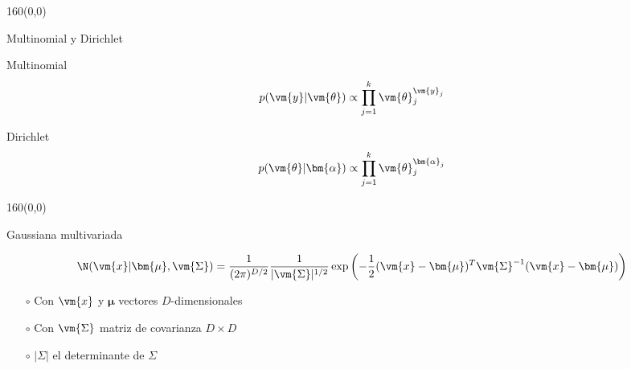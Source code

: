 \documentclass[shownotes,aspectratio=169]{beamer}
\begin{document}
\begin{frame}[plain]
 \begin{textblock}{160}(0,0)
\begin{center}
 \Large Multinomial y Dirichlet \\
\end{center}
\end{textblock}
 \vspace{0.75cm}

 
 \pause
 Multinomial
 \begin{align*}
  p(\vm{y}|\vm{\theta}) \propto \prod_{j=1}^k \vm{\theta}_j^{\vm{y}_j}
 \end{align*}

 
 \pause
 Dirichlet
 \begin{align*}
  p(\vm{\theta}|\bm{\alpha}) \propto \prod_{j=1}^k \vm{\theta}_j^{\bm{\alpha}_j}
 \end{align*}

 
 
 
 \end{frame}

 

%  
%  
%  
 

 \begin{frame}[plain]
 \begin{textblock}{160}(0,0)
\begin{center}
 \Large Gaussiana multivariada
\end{center}
\end{textblock}


\begin{align*}
\N(\vm{x}|\bm{\mu},\vm{\Sigma}) = \frac{1}{(2\pi)^{D/2}} \frac{1}{|\vm{\Sigma}|^{1/2}} \exp\left( - \frac{1}{2} (\vm{x}-\bm{\mu})^T \vm{\Sigma}^{-1} (\vm{x}-\bm{\mu}) \right)
\end{align*}

\vspace{0.5cm}

\begin{itemize}
 \item[$\circ$] Con $\vm{x}$ y $\bm{\mu}$ vectores $D$-dimensionales
 \item[$\circ$] Con $\vm{\Sigma}$ matriz de covarianza $D \times D$
 \item[$\circ$] $|\Sigma|$ el determinante de $\Sigma$
\end{itemize}

 \end{frame}
 
\end{document}
